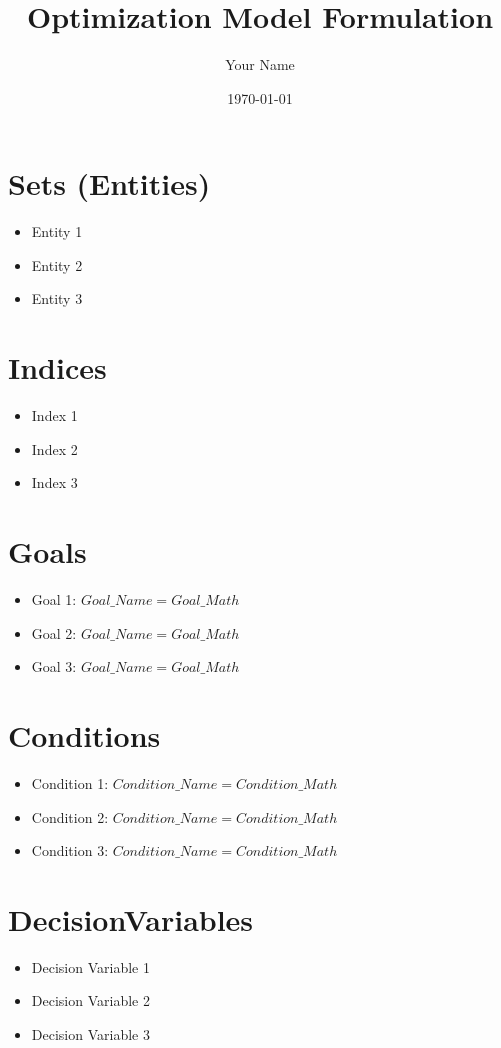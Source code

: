\documentclass{article}
\title{Optimization Model Formulation}
\author{Your Name}
\date{\today}
\begin{document}
\maketitle

\tableofcontents

\section{Sets (Entities)}
\begin{itemize}
    \item Entity 1
    \item Entity 2
    \item Entity 3
\end{itemize}

\section{Indices}
\begin{itemize}
    \item Index 1
    \item Index 2
    \item Index 3
\end{itemize}

\section{Goals}
\begin{itemize}
    \item Goal 1: $Goal\_Name = Goal\_Math$
    \item Goal 2: $Goal\_Name = Goal\_Math$
    \item Goal 3: $Goal\_Name = Goal\_Math$
\end{itemize}

\section{Conditions}
\begin{itemize}
    \item Condition 1: $Condition\_Name = Condition\_Math$
    \item Condition 2: $Condition\_Name = Condition\_Math$
    \item Condition 3: $Condition\_Name = Condition\_Math$
\end{itemize}

\section{DecisionVariables}
\begin{itemize}
    \item Decision Variable 1
    \item Decision Variable 2
    \item Decision Variable 3
\end{itemize}
\end{document}
